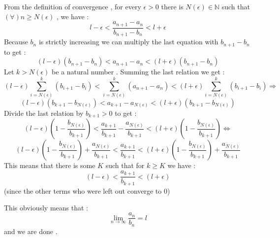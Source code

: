 \documentclass[12pt]{article}
\begin{document}
From the definition of convergence , for every $\epsilon > 0$ there is $N(\epsilon) \in \mathbb{N}$ such that $(\forall) n \geq N(\epsilon)$ , we have :
$$ l-\epsilon < \frac{a_{n+1}-a_n}{b_{n+1}-b_n} < l + \epsilon $$
Because $b_n$ is strictly increasing we can multiply the last equation with $b_{n+1}-b_n$ to get :
$$ (l-\epsilon)(b_{n+1}-b_n) < a_{n+1}-a_n < (l+\epsilon)(b_{n+1}-b_n) $$
Let $k>N(\epsilon)$ be a natural number . Summing the last relation we get :
$$ (l-\epsilon)\sum_{i=N(\epsilon)}^{k}(b_{i+1}-b_i) < \sum_{i=N(\epsilon)}^{k}(a_{n+1}-a_n) < (l+\epsilon)\sum_{i=N(\epsilon)}^{k}(b_{i+1}-b_i) \Rightarrow $$
$$ (l-\epsilon)(b_{k+1}-b_{N(\epsilon)}) < a_{k+1} - a_{N(\epsilon)} < (l+\epsilon)(b_{k+1}-b_{N(\epsilon)})$$
Divide the last relation by $b_{k+1}>0$ to get :
$$ (l-\epsilon)(1 - \frac{b_{N(\epsilon)}}{b_{k+1}}) < \frac{a_{k+1}}{b_{k+1}} - \frac{a_{N(\epsilon)}}{b_{k+1}}<(l+\epsilon)(1 - \frac{b_{N(\epsilon)}}{b_{k+1}}) \Leftrightarrow$$
$$ (l-\epsilon)(1 - \frac{b_{N(\epsilon)}}{b_{k+1}}) + \frac{a_{N(\epsilon)}}{b_{k+1}}< \frac{a_{k+1}}{b_{k+1}}<(l+\epsilon)(1 - \frac{b_{N(\epsilon)}}{b_{k+1}}) + \frac{a_{N(\epsilon)}}{b_{k+1}} $$
This means that there is some $K$ such that for $k \geq K$ we have :
$$(l-\epsilon)<\frac{a_{k+1}}{b_{k+1}}< (l+\epsilon)$$
(since the other terms who were left out converge to 0)

This obviously means that :
$$ \lim_{n \rightarrow \infty} \frac{a_n}{b_n}=l$$
and we are done .
\end{document}

